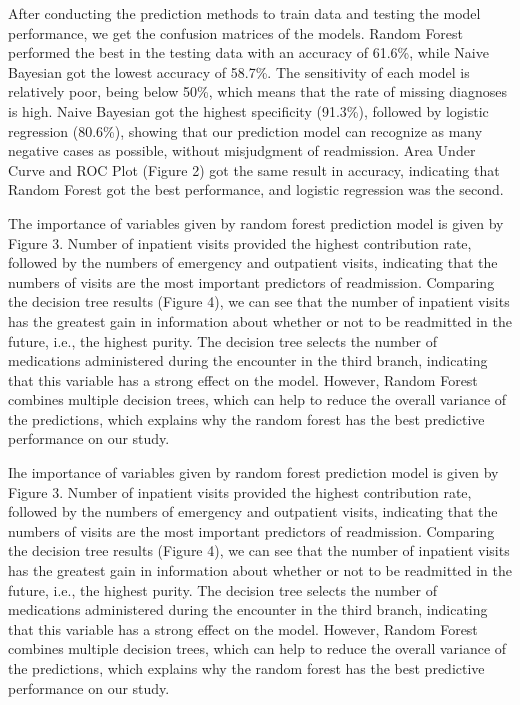 \documentclass[
]{article}
\begin{document}
After conducting the prediction methods to train data and testing the
model performance, we get the confusion matrices of the models. Random
Forest performed the best in the testing data with an accuracy of
61.6\%, while Naive Bayesian got the lowest accuracy of 58.7\%. The
sensitivity of each model is relatively poor, being below 50\%, which
means that the rate of missing diagnoses is high. Naive Bayesian got the
highest specificity (91.3\%), followed by logistic regression (80.6\%),
showing that our prediction model can recognize as many negative cases
as possible, without misjudgment of readmission. Area Under Curve and
ROC Plot (Figure 2) got the same result in accuracy, indicating that
Random Forest got the best performance, and logistic regression was the
second.

The importance of variables given by random forest prediction model is
given by Figure 3. Number of inpatient visits provided the highest
contribution rate, followed by the numbers of emergency and outpatient
visits, indicating that the numbers of visits are the most important
predictors of readmission. Comparing the decision tree results (Figure
4), we can see that the number of inpatient visits has the greatest gain
in information about whether or not to be readmitted in the future,
i.e., the highest purity. The decision tree selects the number of
medications administered during the encounter in the third branch,
indicating that this variable has a strong effect on the model. However,
Random Forest combines multiple decision trees, which can help to reduce
the overall variance of the predictions, which explains why the random
forest has the best predictive performance on our study.

Ihe importance of variables given by random forest prediction model is
given by Figure 3. Number of inpatient visits provided the highest
contribution rate, followed by the numbers of emergency and outpatient
visits, indicating that the numbers of visits are the most important
predictors of readmission. Comparing the decision tree results (Figure
4), we can see that the number of inpatient visits has the greatest gain
in information about whether or not to be readmitted in the future,
i.e., the highest purity. The decision tree selects the number of
medications administered during the encounter in the third branch,
indicating that this variable has a strong effect on the model. However,
Random Forest combines multiple decision trees, which can help to reduce
the overall variance of the predictions, which explains why the random
forest has the best predictive performance on our study.
\end{document}
